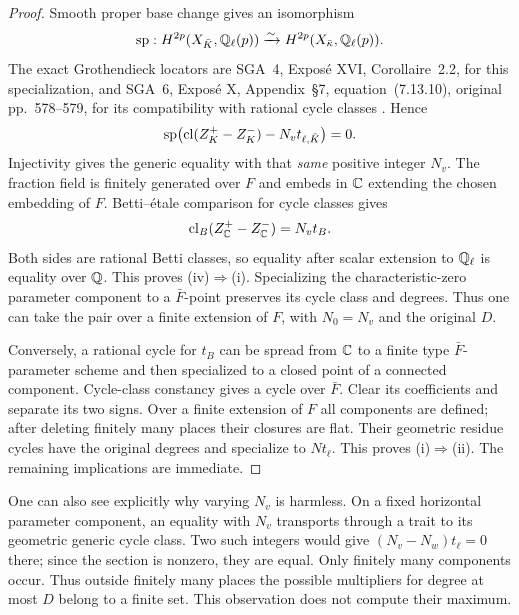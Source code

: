 \begin{proof}
Smooth proper base change gives an isomorphism
\[
 \mathrm{sp}:H^{2p}(X_{\bar K},\mathbb Q_\ell(p))
 \xrightarrow{\sim}H^{2p}(X_{\bar\kappa},\mathbb Q_\ell(p)).
\]
The exact Grothendieck locators are SGA~4, Expos\'e XVI, Corollaire~2.2, for this specialization, and SGA~6, Expos\'e X, Appendix~\S7, equation~(7.13.10), original pp.~578--579, for its compatibility with rational cycle classes \citep{SGA4,SGA6}. Hence
\[
 \mathrm{sp}\bigl(\operatorname{cl}(Z_K^+-Z_K^-)-N_vt_{\ell,\bar K}\bigr)=0.
\]
Injectivity gives the generic equality with that \emph{same} positive integer $N_v$. The fraction field is finitely generated over $F$ and embeds in $\mathbb C$ extending the chosen embedding of $F$. Betti--\'{e}tale comparison for cycle classes gives
\[
 \operatorname{cl}_B(Z_\mathbb C^+-Z_\mathbb C^-)=N_vt_B.
\]
Both sides are rational Betti classes, so equality after scalar extension to $\mathbb Q_\ell$ is equality over $\mathbb Q$. This proves (iv)$\Rightarrow$(i). Specializing the characteristic-zero parameter component to a $\bar F$-point preserves its cycle class and degrees. Thus one can take the pair over a finite extension of $F$, with $N_0=N_v$ and the original $D$.

Conversely, a rational cycle for $t_B$ can be spread from $\mathbb C$ to a finite type $\bar F$-parameter scheme and then specialized to a closed point of a connected component. Cycle-class constancy gives a cycle over $\bar F$. Clear its coefficients and separate its two signs. Over a finite extension of $F$ all components are defined; after deleting finitely many places their closures are flat. Their geometric residue cycles have the original degrees and specialize to $Nt_\ell$. This proves (i)$\Rightarrow$(ii). The remaining implications are immediate.
\end{proof}

One can also see explicitly why varying $N_v$ is harmless. On a fixed horizontal parameter component, an equality with $N_v$ transports through a trait to its geometric generic cycle class. Two such integers would give $(N_v-N_w)t_\ell=0$ there; since the section is nonzero, they are equal. Only finitely many components occur. Thus outside finitely many places the possible multipliers for degree at most $D$ belong to a finite set. This observation does not compute their maximum.

